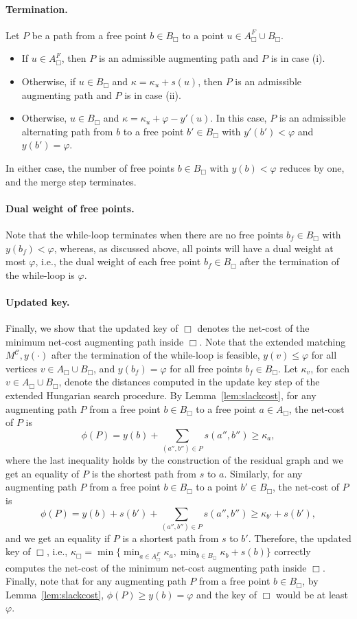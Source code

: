 \documentclass[11pt,onecolumn]{article}
\def\mcC{{\mathcal{C}}}
\newcommand{\freeofcell}[2]{{#1}_{#2}^F}
\newcommand{\cell}{\Box}
\newcommand{\ymax}{\varphi}
\newcommand\myparagraph[1]{\paragraph{#1}}
\begin{document}
    \myparagraph{Termination.} Let $P$ be a path from a free point $b\in B_\cell$ to a point $u\in \freeofcell{A}{\cell}\cup B_\cell$.
    \begin{itemize}
        \item If $u\in\freeofcell{A}{\cell}$, then $P$ is an admissible augmenting path and $P$ is in case (i).
        \item Otherwise, if $u\in B_\cell$ and $\kappa=\kappa_u+s(u)$, then $P$ is an admissible augmenting path and $P$ is in case (ii).
        \item Otherwise, $u\in B_\cell$ and $\kappa=\kappa_u+\ymax - y'(u)$. In this case, $P$ is an admissible alternating path from $b$ to a free point $b'\in B_\cell$ with $y'(b') < \ymax$ and $y(b')=\ymax$. 
    \end{itemize}
    In either case, the number of free points $b\in B_\cell$ with $y(b)<\ymax$ reduces by one, and the merge step terminates.

    \myparagraph{Dual weight of free points.} Note that the while-loop terminates when there are no free points $b_f\in B_\cell$ with $y(b_f)<\ymax$, whereas, as discussed above, all points will have a dual weight at most $\ymax$, i.e., the dual weight of each free point $b_f\in B_\cell$ after the termination of the while-loop is $\ymax$.

    
\myparagraph{Updated key.} Finally, we show that the updated key of $\cell$ denotes the net-cost of the minimum net-cost augmenting path inside $\cell$. Note that the extended matching $M^\mcC, y(\cdot)$ after the termination of the while-loop is feasible, $y(v)\le \ymax$ for all vertices $v\in A_\cell\cup B_\cell$, and $y(b_f)=\ymax$ for all free points $b_f\in B_\cell$. Let $\kappa_v$, for each $v\in A_\cell\cup B_\cell$, denote the distances computed in the update key step of the extended Hungarian search procedure. By Lemma~\ref{lem:slackcost}, for any augmenting path $P$ from a free point $b\in B_\cell$ to a free point $a\in A_\cell$, the net-cost of $P$ is 
\[\phi(P)=y(b) +\sum_{(a'',b'')\in P}s(a'',b'') \ge \kappa_a,\] where the last inequality holds by the construction of the residual graph and we get an equality of $P$ is the shortest path from $s$ to $a$. Similarly, for any augmenting path $P$ from a free point $b\in B_\cell$ to a point $b'\in B_\cell$, the net-cost of $P$ is 
\[\phi(P)=y(b) + s(b') +\sum_{(a'',b'')\in P}s(a'',b'') \ge \kappa_{b'} + s(b'),\]
and we get an equality if $P$ is a shortest path from $s$ to $b'$.
Therefore, the updated key of $\cell$, i.e., $\kappa_\cell=\min\{\min_{a\in A_\cell^F}\kappa_a, \min_{b\in B_\cell}\kappa_b+s(b)\}$ correctly computes the net-cost of the minimum net-cost augmenting path inside $\cell$. Finally, note that for any augmenting path $P$ from a free point $b\in B_\cell$, by Lemma~\ref{lem:slackcost}, $\phi(P)\ge y(b)=\ymax$ and the key of $\cell$ would be at least $\ymax$.
\end{document}
